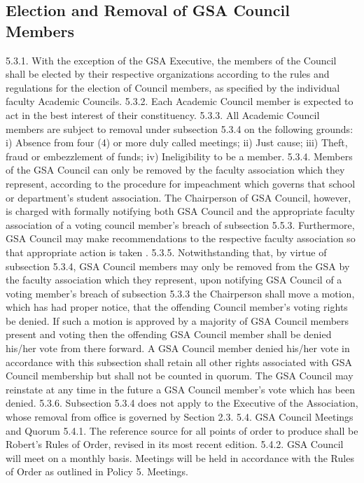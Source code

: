 \subsection{Election and Removal of GSA Council Members }
5.3.1. With the exception of the GSA Executive, the members of the Council 
shall be elected by their respective organizations according to the rules 
and regulations for the election of Council members, as specified by 
the individual faculty Academic Councils. 
5.3.2. Each Academic Council member is expected to act in the best interest 
of their constituency. 
5.3.3. All Academic Council members are subject to removal under 
subsection 5.3.4 on the following grounds: 
i) Absence from four (4) or more duly called meetings; 
ii) Just cause; 
iii) Theft, fraud or embezzlement of funds; 
iv) Ineligibility to be a member. 
5.3.4. Members of the GSA Council can only be removed by the faculty 
association which they represent, according to the procedure for 
impeachment which governs that school or department’s student 
association. The Chairperson of GSA Council, however, is charged 
with formally notifying both GSA Council and the appropriate faculty 
association of a voting council member's breach of subsection 5.5.3. 
Furthermore, GSA Council may make recommendations to the 
respective faculty association so that appropriate action is taken . 
5.3.5. Notwithstanding that, by virtue of subsection 5.3.4, GSA Council 
members may only be removed from the GSA by the faculty 
association which they represent, upon notifying GSA Council of a 
voting member's breach of subsection 5.3.3 the Chairperson shall 
move a motion, which has had proper notice, that the offending 
Council member's voting rights be denied. If such a motion is 
approved by a majority of GSA Council members present and voting 
then the offending GSA Council member shall be denied his/her vote 
from there forward. A GSA Council member denied his/her vote in 
accordance with this subsection shall retain all other rights associated 
with GSA Council membership but shall not be counted in quorum. 
The GSA Council may reinstate at any time in the future a GSA 
Council member's vote which has been denied. 
5.3.6. Subsection 5.3.4 does not apply to the Executive of the Association, 
whose removal from office is governed by Section 2.3. 
5.4. GSA Council Meetings and Quorum 
5.4.1. The reference source for all points of order to produce shall be 
Robert’s Rules of Order, revised in its most recent edition. 
5.4.2. GSA Council will meet on a monthly basis. Meetings will be held in 
accordance with the Rules of Order as outlined in Policy 5. Meetings. 
